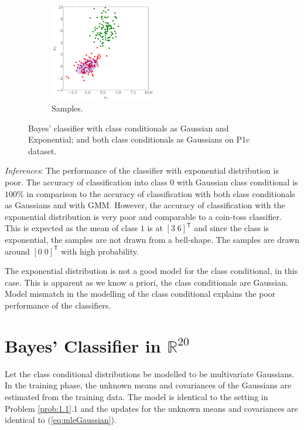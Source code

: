 \documentclass[11pt, a4 paper]{article}
\newcommand{\rr}{\mathbb{R}}
\newcommand{\TT}{\mathsf{T}}
\begin{document}
\begin{figure}[!htbp]
\begin{subfigure}[!htbp]{0.24\textwidth}
       \includegraphics[width=1.8in]{../results/ex1/samples_QD_EXP_ML_dataset_P1c_size_199.pdf}
       \caption{Samples.}
       \label{fig:samples_P1c}
    \end{subfigure}
\caption{Bayes' classifier with class conditionals as Gaussian and Exponential; and both class conditionals as Gaussians on P1c dataset.}
\label{fig:ex13P1c}
\end{figure}
{\it Inferences}: The performance of the classifier with exponential distribution is poor. The accuracy of classification into class $0$ with Gaussian class conditional is $100\%$ in comparison to the accuracy of classification with both class conditionals as Gaussians and with GMM. However, the accuracy of classification with the exponential distribution is very poor and comparable to a coin-toss classifier. This is expected as the mean of class $1$ is at $[3\; 6]^{\TT}$ and since the class is exponential, the samples are not drawn from a bell-shape. The samples are drawn around $[0\; 0]^{\TT}$ with high probability.

The exponential distribution is not a good model for the class conditional, in this case. This is apparent as we know a priori, the class conditionals are Gaussian. Model mismatch in the modelling of the class conditional explains the poor performance of the classifiers.


\section{Bayes' Classifier in $\rr^{20}$}
\label{sec:bayes20D}

\label{prob:2}
Let the class conditional distributions be modelled to be multivariate Gaussians. In the training phase, the unknown means and covariances of the Gaussians are estimated from the training data. The model is identical to the setting in Problem \ref{prob:1.1}.1 and the updates for the unknown means and covariances are identical to (\ref{eq:mleGaussian}).
\end{document}

